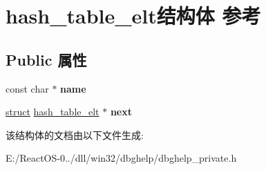 \hypertarget{structhash__table__elt}{}\section{hash\+\_\+table\+\_\+elt结构体 参考}
\label{structhash__table__elt}
\subsection*{Public 属性}
\begin{DoxyCompactItemize}
\item 
\mbox{\label{structhash__table__elt_ace1fdc6a3859822509e505409e017df6}} 
const char $\ast$ {\bfseries name}
\item 
\mbox{\label{structhash__table__elt_a6b3012e0b76263e80c72c484dcf25ce4}} 
\hyperlink{interfacestruct}{struct} \hyperlink{structhash__table__elt}{hash\+\_\+table\+\_\+elt} $\ast$ {\bfseries next}
\end{DoxyCompactItemize}


该结构体的文档由以下文件生成\+:\begin{DoxyCompactItemize}
\item 
E\+:/\+React\+O\+S-\/0../dll/win32/dbghelp/dbghelp\+\_\+private.\+h\end{DoxyCompactItemize}
